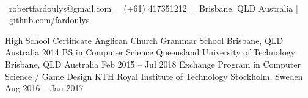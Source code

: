 \documentclass[]{awesome-cv}
\begin{document}
    
\begin{center}
	  \\
	\vspace{2mm}
	{\faEnvelope\ robertfardoulys@gmail.com} | {\faMobile\ (+61) 417351212} | {\faMapMarker\ Brisbane, QLD Australia} | {\faGithub\ github.com/fardoulys}
\end{center}
\begin{cventries}
	\cventry
	{High School Certificate}
	{Anglican Church Grammar School}
	{Brisbane, QLD Australia}
	{2014}
	{}
	\cventry
	{BS in Computer Science}
	{Queensland University of Technology}
	{Brisbane, QLD Australia}
	{Feb 2015 – Jul 2018}
	{}
	\cventry
	{Exchange Program in Computer Science / Game Design}
	{KTH Royal Institute of Technology}
	{Stockholm, Sweden}
	{Aug 2016 – Jan 2017}
	{}
\end{cventries}
\end{document}
